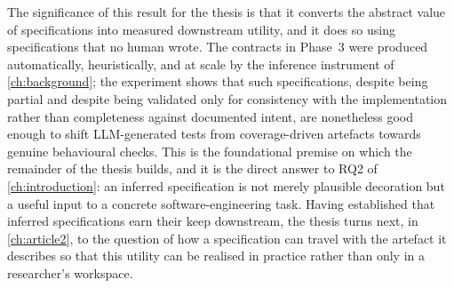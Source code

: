 The significance of this result for the thesis is that it converts the abstract
value of specifications into measured downstream utility, and it does so using
specifications that no human wrote. The contracts in Phase~3 were produced
automatically, heuristically, and at scale by the inference instrument of
\cref{ch:background}; the experiment shows that such specifications, despite being
partial and despite being validated only for consistency with the implementation
rather than completeness against documented intent, are nonetheless good enough to
shift LLM-generated tests from coverage-driven artefacts towards genuine
behavioural checks. This is the foundational premise on which the remainder of the
thesis builds, and it is the direct answer to RQ2 of \cref{ch:introduction}: an
inferred specification is not merely plausible decoration but a useful input to a
concrete software-engineering task. Having established that inferred
specifications earn their keep downstream, the thesis turns next, in
\cref{ch:article2}, to the question of how a specification can travel with the
artefact it describes so that this utility can be realised in practice rather than
only in a researcher's workspace.
